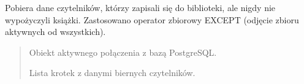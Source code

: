 \documentclass[a4paper,11pt,english,openany,oneside]{sphinxmanual}
\begin{document}

\begin{savenotes}\begin{fulllineitems}
\label{\detokenize{rozdzial_5/index:biblioteka_zapytania.get_czytelnicy_bez_wypozyczen}}
\pysigstartsignatures
\pysiglinewithargsret
{}
{}
{}
\pysigstopsignatures
\sphinxAtStartPar
Pobiera dane czytelników, którzy zapisali się do biblioteki, ale nigdy nie wypożyczyli książki.
Zastosowano operator zbiorowy EXCEPT (odjęcie zbioru aktywnych od wszystkich).

\sphinxAtStartPar
{}

\begin{sphinxVerbatim}[commandchars=\\\{\}]
\end{sphinxVerbatim}
\begin{quote}\begin{description}
\sphinxAtStartPar
{} \textendash{} Obiekt aktywnego połączenia z bazą PostgreSQL.

\sphinxAtStartPar
Lista krotek z danymi biernych czytelników.

\end{description}\end{quote}

\end{fulllineitems}\end{savenotes}
\end{document}
